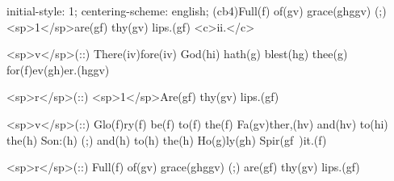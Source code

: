 initial-style: 1;
centering-scheme: english;
(cb4)Full(f) of(gv) grace(ghggv) (;) <sp>1</sp>are(gf) thy(gv) lips.(gf) <c>ii.</c>

<sp>v</sp>(::) There(iv)fore(iv) God(hi) hath(g) blest(hg) thee(g) for(f)ev(gh)er.(hggv)

<sp>r</sp>(::) <sp>1</sp>Are(gf) thy(gv) lips.(gf)

<sp>v</sp>(::) Glo(f)ry(f) be(f) to(f) the(f) Fa(gv)ther,(hv) and(hv) to(hi) the(h) Son:(h) (;) and(h) to(h) the(h) Ho(g)ly(gh) Spir(gf~)it.(f)

<sp>r</sp>(::) Full(f) of(gv) grace(ghggv) (;) are(gf) thy(gv) lips.(gf)